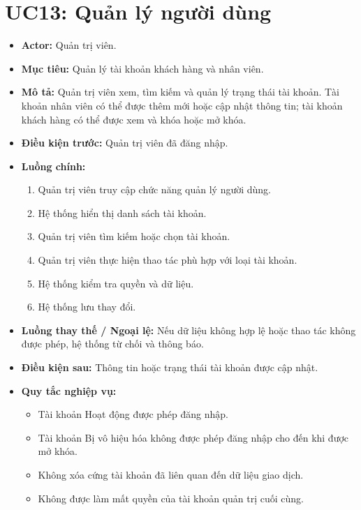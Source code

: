 \section{UC13: Quản lý người dùng}
\begin{itemize}
    \item \textbf{Actor:} Quản trị viên.
    \item \textbf{Mục tiêu:} Quản lý tài khoản khách hàng và nhân viên.
    \item \textbf{Mô tả:} Quản trị viên xem, tìm kiếm và quản lý trạng thái tài khoản. Tài khoản nhân viên có thể được thêm mới hoặc cập nhật thông tin; tài khoản khách hàng có thể được xem và khóa hoặc mở khóa.
    \item \textbf{Điều kiện trước:} Quản trị viên đã đăng nhập.
    \item \textbf{Luồng chính:}
    \begin{enumerate}
        \item Quản trị viên truy cập chức năng quản lý người dùng.
        \item Hệ thống hiển thị danh sách tài khoản.
        \item Quản trị viên tìm kiếm hoặc chọn tài khoản.
        \item Quản trị viên thực hiện thao tác phù hợp với loại tài khoản.
        \item Hệ thống kiểm tra quyền và dữ liệu.
        \item Hệ thống lưu thay đổi.
    \end{enumerate}
    \item \textbf{Luồng thay thế / Ngoại lệ:} Nếu dữ liệu không hợp lệ hoặc thao tác không được phép, hệ thống từ chối và thông báo.
    \item \textbf{Điều kiện sau:} Thông tin hoặc trạng thái tài khoản được cập nhật.
    \item \textbf{Quy tắc nghiệp vụ:}
    \begin{itemize}
        \item Tài khoản Hoạt động được phép đăng nhập.
        \item Tài khoản Bị vô hiệu hóa không được phép đăng nhập cho đến khi được mở khóa.
        \item Không xóa cứng tài khoản đã liên quan đến dữ liệu giao dịch.
        \item Không được làm mất quyền của tài khoản quản trị cuối cùng.
    \end{itemize}
\end{itemize}

